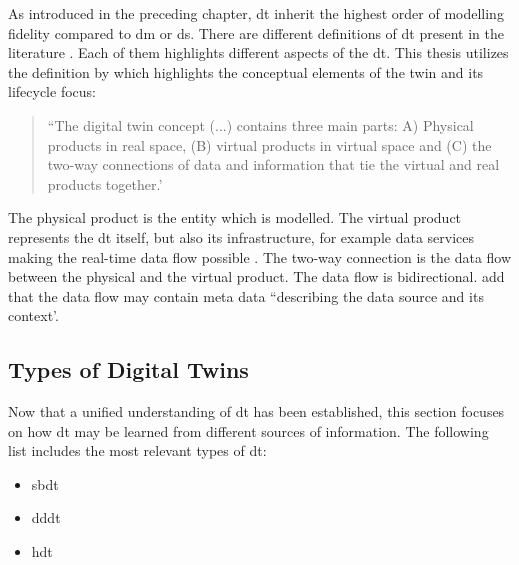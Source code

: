As introduced in the preceding chapter, \gls{dt} inherit the highest order of modelling fidelity compared to \gls{dm} or \gls{ds}. There are different definitions of \gls{dt} present in the literature \autocite{Negri2017promfg,zheng2019application,glaessgen2012digital,Demkovich2018def,boschert2016digital,grieves2014digital,kritzinger2018digital,Tao2018ijamt,zehnder2018representing}. Each of them highlights different aspects of the \gls{dt}. This thesis utilizes the definition by \textcite{grieves2014digital} which highlights the conceptual elements of the twin and its lifecycle focus:

\begin{quote}
    ``The digital twin concept (...) contains three main parts: A) Physical products in real space, (B) virtual products in virtual space and (C) the two-way connections of data and information that tie the virtual and real products together.' \autocite{grieves2014digital}
\end{quote}

The physical product is the entity which is modelled. The virtual product represents the \gls{dt} itself, but also its infrastructure, for example data services making the real-time data flow possible \autocite{Tao2018ijamt}. The two-way connection is the data flow between the physical and the virtual product. The data flow is bidirectional. \textcite{zehnder2018representing} add that the data flow may contain meta data ``describing the data source and its context'.

\subsection*{Types of Digital Twins}
\label{sec:types-digital-twins}
Now that a unified understanding of \gls{dt} has been established, this section focuses on how \gls{dt} may be learned from different sources of information. The following list includes the most relevant types of \gls{dt}:

\begin{itemize}
    \item \gls{sbdt} \autocite{Lugaresi2021aifac,martinez2018automatic}
    \item \gls{dddt} \autocite{he2019data,Friederich2022}
    \item \gls{hdt} \autocite{luo2020hybrid,huang2023hybrid}
\end{itemize}


